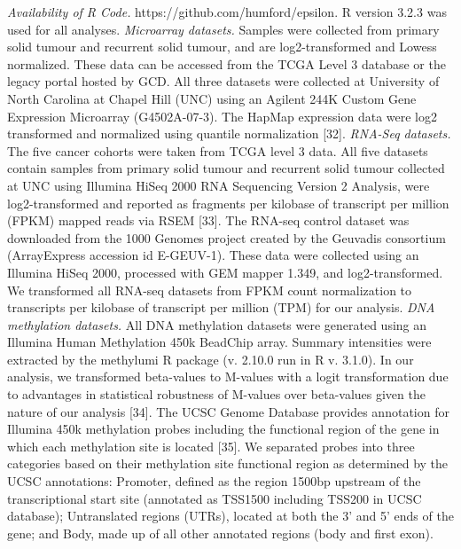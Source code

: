 \documentclass[11pt]{article}
\begin{document}
\textit{Availability of R Code.} https://github.com/humford/epsilon. R version 3.2.3 was used for all analyses.
\newline
\newline
\textit{Microarray datasets.} Samples were collected from primary solid tumour and recurrent solid tumour, and are log2-transformed and Lowess normalized. These data can be accessed from the TCGA Level 3 database or the legacy portal hosted by GCD. All three datasets were collected at University of North Carolina at Chapel Hill (UNC) using an Agilent 244K Custom Gene Expression Microarray (G4502A-07-3). The HapMap expression data were log2 transformed and normalized using quantile normalization [32].
\newline
\newline
\textit{RNA-Seq datasets.} The five cancer cohorts were taken from TCGA level 3 data. All five datasets contain samples from primary solid tumour and recurrent solid tumour collected at UNC using Illumina HiSeq 2000 RNA Sequencing Version 2 Analysis, were log2-transformed and reported as fragments per kilobase of transcript per million (FPKM) mapped reads via RSEM [33]. The RNA-seq control dataset was downloaded from the 1000 Genomes project created by the Geuvadis consortium (ArrayExpress accession id E-GEUV-1). These data were collected using an Illumina HiSeq 2000, processed with GEM mapper 1.349, and log2-transformed. We transformed all RNA-seq datasets from FPKM count normalization to transcripts per kilobase of transcript per million (TPM) for our analysis.
\newline
\newline
\textit{DNA methylation datasets.} All DNA methylation datasets were generated using an Illumina Human Methylation 450k BeadChip array. Summary intensities were extracted by the methylumi R package (v. 2.10.0 run in R v. 3.1.0). In our analysis, we transformed beta-values to M-values with a logit transformation due to advantages in statistical robustness of M-values over beta-values given the nature of our analysis [34]. The UCSC Genome Database provides annotation for Illumina 450k methylation probes including the functional region of the gene in which each methylation site is located [35]. We separated probes into three categories based on their methylation site functional region as determined by the UCSC annotations: Promoter, defined as the region 1500bp upstream of the transcriptional start site (annotated as TSS1500 including TSS200 in UCSC database); Untranslated regions (UTRs), located at both the 3’ and 5’ ends of the gene; and Body, made up of all other annotated regions (body and first exon).
\end{document}
